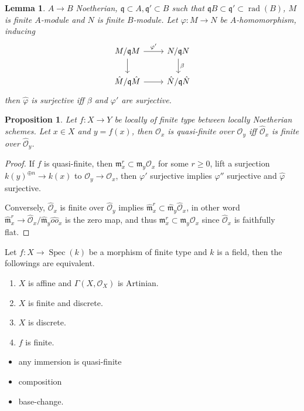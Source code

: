 \documentclass[leqno]{amsart}
\DeclareMathOperator{\rad}{rad}
\DeclareMathOperator{\Spec}{Spec}
\newcommand{\oo}{\mathcal O}
\newcommand{\1}{\mathbf{1}}
\newcommand{\fm}{\mathfrak m}
\newcommand{\fq}{\mathfrak q}
\newtheorem{lem}[thm]{Lemma}
\newtheorem{prop}[thm]{Proposition}
\theoremstyle{definition}
\theoremstyle{remark}
\begin{document}
\begin{lem}
	$A\to B$ Noetherian,  $\fq\subset A, \fq'\subset B$
	such that  $\fq B\subset \fq'\subset \rad(B)$,
	$M$ is finite  $A$-module and  $N$ is finite  $B$-module.
	Let  $\varphi\colon M\to N$ be  $A$-homomorphism, inducing
	 \[
		\begin{tikzcd}
		M/\fq M\arrow[r,"\varphi'"]\arrow[d]&
			N/\fq N\arrow[d,"\beta"]\\
			\hat{M}/\fq \hat{M}\arrow[r]&
			\hat{N}/\fq \hat{N}
		\end{tikzcd}
	\]
	then  $ \hat{\varphi}$ is surjective 
	iff $\beta$ and  $\varphi'$ are surjective.
\end{lem}

\begin{prop}
	Let $f\colon X\to Y$ be locally of finite type
	between  locally Noetherian schemes.
	Let  $x\in X$ and  $y=f(x)$,
	then  $\oo_x$ is quasi-finite over  $\oo_y$
	iff  $ \hat{\oo}_x$ is finite over $ \hat{\oo}_y$.
\end{prop}
\begin{proof}
	If $f$ is quasi-finite,
	then  $\fm_x^r\subset \fm_y\oo_x$ for some  $r\geq 0$,
	lift a surjection  $k(y)^{\oplus n}\to k(x)$ 
	to $\oo_y\to \oo_x$,
	then  $\varphi'$ surjective implies 
	 $\varphi''$ surjective
	 and  $ \hat{\varphi}$ surjective.

	 Conversely, $ \hat{\oo}_x$ is finite
	 over $ \hat{\oo}_y$ implies
	 $ \hat{\fm}_x^r\subset \hat{\fm}_y\hat{\oo}_x$,
	 in other word $ \hat{\fm}_x^r\to \hat{\oo}_x/\hat{\fm}_y\hat{oo}_x$ is the zero map,
	 and thus $\fm_x^r\subset \fm_y\oo_x$
	 since  $ \hat{\oo}_x$ is faithfully flat.
\end{proof}

Let $f\colon X\to \Spec(k)$ be a morphism of finite type
and  $k$ is a field, then the followings are equivalent.
 \begin{enumerate}[label=(\alph*)]
	 \item $X$ is affine and $\Gamma(X,\oo_X)$ is Artinian.
	 \item  $X$ is finite and discrete.
	 \item  $X$ is discrete.
	 \item  $f$ is finite.
\end{enumerate}
\begin{itemize}
	\item any immersion is quasi-finite
	\item composition
	\item base-change.
\end{itemize}
\end{document}
